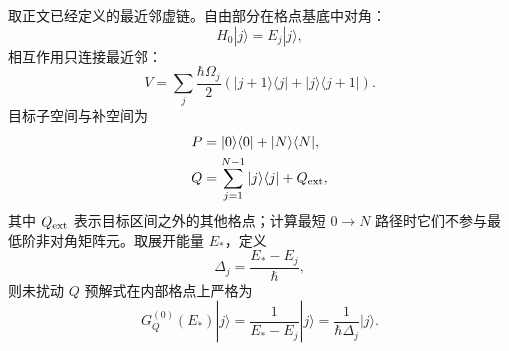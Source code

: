 \begin{derivation}[虚通道链中的有效耦合与能级移动]
取正文已经定义的最近邻虚链。自由部分在格点基底中对角：
\begin{equation*}
 H_0|j\rangle=E_j|j\rangle,
\end{equation*}
相互作用只连接最近邻：
\begin{equation*}
 V
 =\sum_j\frac{\hbar\Omega_j}{2}
 \left(|j+1\rangle\langle j|+|j\rangle\langle j+1|\right).
\end{equation*}
目标子空间与补空间为
\begin{align*}
 P&=|0\rangle\langle0|+|N\rangle\langle N|,\\
 Q&=\sum_{j=1}^{N-1}|j\rangle\langle j|+Q_{\rm ext},
\end{align*}
其中 $Q_{\rm ext}$ 表示目标区间之外的其他格点；计算最短 $0\to N$ 路径时它们不参与最低阶非对角矩阵元。取展开能量 $E_*$，定义
\begin{equation*}
 \Delta_j=\frac{E_*-E_j}{\hbar},
\end{equation*}
则未扰动 $Q$ 预解式在内部格点上严格为
\begin{equation*}
 G_Q^{(0)}(E_*)|j\rangle
 =\frac1{E_*-E_j}|j\rangle
 =\frac1{\hbar\Delta_j}|j\rangle.
\end{equation*}


\end{derivation}

